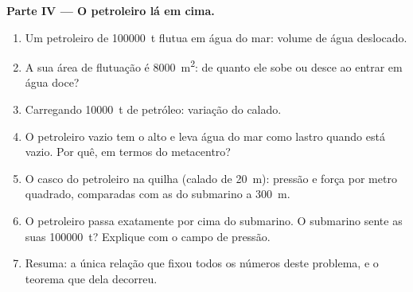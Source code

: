 \begin{problem}
\medskip
\noindent\textbf{Parte IV --- O petroleiro lá em cima.}
\begin{enumerate}[resume]
  \item Um petroleiro de \qty{100000}{t} flutua em água do mar: volume de
        água deslocado.
  \item A sua área de flutuação é \qty{8000}{m^2}: de quanto ele sobe ou
        desce ao entrar em água doce?
  \item Carregando \qty{10000}{t} de petróleo: variação do calado.
  \item O petroleiro vazio tem o  alto e leva água do mar
        como lastro quando está vazio. Por quê, em termos do metacentro?
  \item O casco do petroleiro na quilha (calado de \qty{20}{m}): pressão e
        força por metro quadrado, comparadas com as do submarino a
        \qty{300}{m}.
  \item O petroleiro passa exatamente por cima do submarino. O submarino
        sente as suas \qty{100000}{t}? Explique com o campo de pressão.
  \item Resuma: a única relação que fixou todos os números deste problema,
        e o teorema que dela decorreu.
\end{enumerate}
\end{problem}
